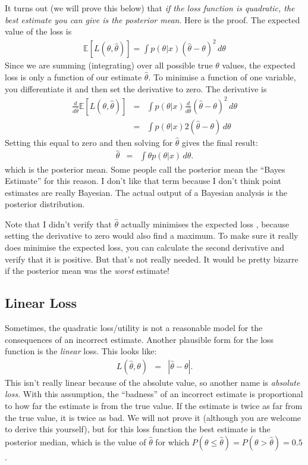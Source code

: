It turns out (we will prove this below) that {\it if the loss function is
quadratic, the best estimate you can give is the posterior mean}.
Here is the proof. The expected value of the loss is
\begin{eqnarray}
\mathds{E}\left[L(\theta, \hat{\theta})\right] =
\int p(\theta|x)(\hat{\theta} - \theta)^2 \, d\theta
\end{eqnarray}
Since we are summing (integrating) over all possible true $\theta$ values, 
the expected loss is only a function of our estimate $\hat{\theta}$. To minimise a function
of one variable, you differentiate it and then set the derivative to zero.
The derivative is
\begin{eqnarray}
\frac{d}{d\hat{\theta}}\mathds{E}\left[L(\theta, \hat{\theta})\right] &=&
\int p(\theta|x)\frac{d}{d\hat{\theta}}(\hat{\theta} - \theta)^2 \, d\theta \\
&=& \int p(\theta|x)2(\hat{\theta} - \theta) \, d\theta
\end{eqnarray}
Setting this equal to zero and then solving for $\hat{\theta}$ gives the final
result:
\begin{eqnarray}
\hat{\theta} &=& \int \theta p(\theta|x) \, d\theta.
\end{eqnarray}
which is the posterior mean. Some people call the posterior mean the ``Bayes
Estimate'' for this reason. I don't like that term because I don't think
point estimates are really Bayesian.
The actual output of a Bayesian analysis is the posterior distribution.

Note that I didn't verify that $\hat{\theta}$ actually minimises the expected loss
, because setting the derivative to zero would also find a maximum. To make sure
it really does minimise the expected loss, you can calculate the second
derivative and verify that it is
positive. But that's not really needed. It would be pretty bizarre if the
posterior mean was the {\it worst} estimate!

\subsection{Linear Loss}
Sometimes, the quadratic loss/utility is not a reasonable model
for the consequences of an incorrect estimate. Another plausible form for the loss
function is the {\it linear} loss. This looks like:
\begin{eqnarray}
L(\hat{\theta}, \theta) &=& |\hat{\theta} - \theta|.
\end{eqnarray}
This isn't really linear because of the absolute value, so another name
is {\it absolute loss}.
With this assumption, the ``badness'' of an incorrect estimate is proportional
to how far the estimate is from the true value. If the estimate is twice as
far from the true value, it is twice as bad. We will not prove it (although you
are welcome to derive this yourself), but for this loss function
the best estimate is the posterior median, which is the value of $\hat{\theta}$
for which $P(\theta \leq \hat{\theta}) = P(\theta > \hat{\theta}) = 0.5$.

